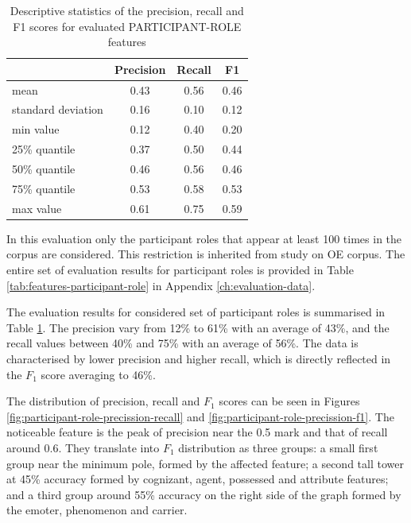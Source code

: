     \begin{table}[!b]
    \centering
    \begin{tabular}{lccc}
        \toprule
        {} & {Precision} & {Recall} & {F1} \\ %
        \midrule
        mean & 0.43 & 0.56 & 0.46 \\
        standard deviation & 0.16 & 0.10 & 0.12 \\
        min value & 0.12 & 0.40 & 0.20 \\
        25\% quantile & 0.37 & 0.50 & 0.44 \\
        50\% quantile & 0.46 & 0.56 & 0.46 \\
        75\% quantile & 0.53 & 0.58 & 0.53 \\
        max value & 0.61 & 0.75 & 0.59 \\
        \bottomrule
    \end{tabular}
    \caption{Descriptive statistics of the precision, recall and F1 scores for evaluated PARTICIPANT-ROLE features}
    \label{tab:features-participant-role-accuracy}
    \end{table}
    
    In this evaluation only the participant roles that appear at least 100 times in the corpus are considered. This restriction is inherited from \citet[160-162]{schulz2015me} study on OE corpus. The entire set of evaluation results for participant roles is provided in Table \ref{tab:features-participant-role} in Appendix \ref{ch:evaluation-data}. 
    
    The evaluation results for considered set of participant roles is summarised in Table \ref{tab:features-participant-role-accuracy}. The precision vary from 12\% to 61\% with an average of 43\%, and the recall values between 40\% and 75\% with an average of 56\%. The data is characterised by lower precision and higher recall, which is directly reflected in the $F_1$ score averaging to 46\%. 
    
    The distribution of precision, recall and $F_1$ scores can be seen in Figures \ref{fig:participant-role-precission-recall} and \ref{fig:participant-role-precission-f1}. The noticeable feature is the peak of precision near the 0.5 mark and that of recall around 0.6. They translate into $F_1$ distribution as three groups: a small first group near the minimum pole, formed by the affected feature; a second tall tower at 45\% accuracy formed by cognizant, agent, possessed and attribute features; and a third group around 55\% accuracy on the right side of the graph formed by the emoter, phenomenon and carrier.
    
